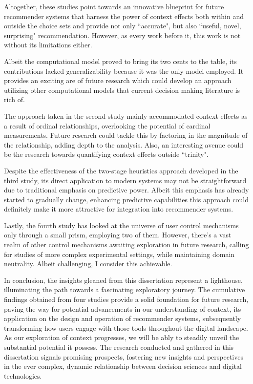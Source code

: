 \documentclass[a4paper,12pt]{article}
\begin{document}
Altogether, these studies point towards an innovative blueprint for future recommender systems that harness the power of context effects both within and outside the choice sets and provide not only ``accurate", but also ``useful, novel, surprising" recommendation. However, as every work before it, this work is not without its limitations either.

Albeit the computational model proved to bring its two cents to the table, its contributions lacked generalizability because it was the only model employed. It provides an exciting are of future research which could develop an approach utilizing other computational models that current decision making literature is rich of. 

The approach taken in the second study mainly accommodated context effects as a result of ordinal relationships, overlooking the potential of cardinal measurements. Future research could tackle this by factoring in the magnitude of the relationship, adding depth to the analysis. Also, an interesting avenue could be the research towards quantifying context effects outside ``trinity". 

Despite the effectiveness of the two-stage heuristics approach developed in the third study, its direct application to modern systems may not be straightforward due to traditional emphasis on predictive power. Albeit this emphasis has already started to gradually change, enhancing predictive capabilities this approach could definitely make it more attractive for integration into recommender systems.

Lastly, the fourth study has looked at the universe of user control mechanisms only through a small prism, employing two of them. However, there's a vast realm of other control mechanisms awaiting exploration in future research, calling for studies of more complex experimental settings, while maintaining domain neutrality. Albeit challenging, I consider this achievable.

In conclusion, the insights gleaned from this dissertation represent a lighthouse, illuminating the path towards a fascinating exploratory journey. The cumulative findings obtained from four studies provide a solid foundation for future research, paving the way for potential advancements in our understanding of context, its application on the design and operation of recommender systems, subsequently transforming how users engage with those tools throughout the digital landscape. As our exploration of context progresses, we will be ably to steadily unveil the substantial potential it possess. The research conducted and gathered in this dissertation signals promising prospects, fostering new insights and perspectives in the ever complex, dynamic relationship between decision sciences and digital technologies.
\end{document}
